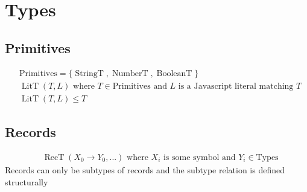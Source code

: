 \documentclass{article}
\DeclareMathOperator{\StringT}{StringT}
\DeclareMathOperator{\NumberT}{NumberT}
\DeclareMathOperator{\BooleanT}{BooleanT}
\DeclareMathOperator{\LitT}{LitT}
\DeclareMathOperator{\RecT}{RecT}
\begin{document}
\section{Types}
\subsection{Primitives}

\[
\begin{aligned}
&\text{Primitives} = \{ \StringT, \NumberT, \BooleanT\}\\
&\LitT(T, L) \text{ where $T \in \text{Primitives}$ and $L$ is a Javascript literal matching $T$}\\
&\LitT(T, L) \le T
\end{aligned}
\]

\subsection{Records}

\[
\begin{aligned}
&\RecT(X_0 \rightarrow Y_0, ...) \text{ where $X_i$ is some symbol and $Y_i \in \text{Types}$}
\end{aligned}
\]
Records can only be subtypes of records and the subtype relation is defined structurally











\end{document}
